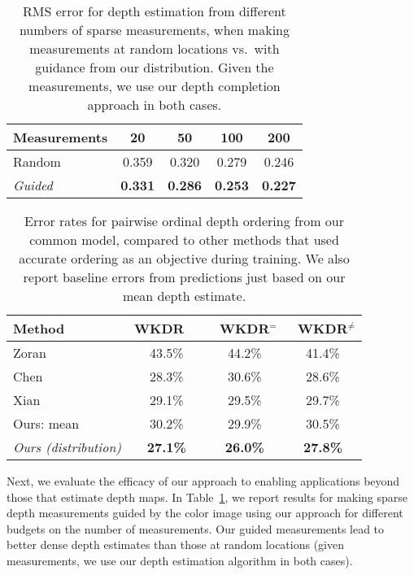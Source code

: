 \documentclass[10pt,twocolumn,letterpaper]{article}
\begin{document}
\begin{table}[!t]
  \begin{center}\small
  \setlength\tabcolsep{10pt}
  \begin{tabular}{lcccc}
    \toprule
    Measurements & 20 & 50 & 100 & 200 \\ \midrule
    Random & 0.359 & 0.320 & 0.279 & 0.246 \\
    \em Guided & \bf 0.331 & \bf 0.286 & \bf 0.253 & \bf 0.227 \\\bottomrule
             
  \end{tabular}
  \end{center}
  \caption{RMS error for depth estimation from different numbers of sparse measurements, when making measurements at random locations vs.\ with guidance from our distribution. Given the measurements, we use our depth completion approach in both cases.}
  \label{tab:opt}
\end{table}
\begin{table}[!t]
  \begin{center}\small
  \setlength\tabcolsep{4pt}
  \begin{tabular}{lccc}
    \toprule
    Method & WKDR~~ & ~WKDR$^{=}$ & ~WKDR$^{\neq}$ \\ \toprule
    Zoran \cite{zoran2015learning} & 43.5\% & 44.2\% & 41.4\% \\
    Chen \cite{chen2016single} & 28.3\% & 30.6\% & 28.6\% \\
    Xian \cite{xian2018monocular} & 29.1\% & 29.5\% & 29.7\% \\
    Ours: mean  & 30.2\% & 29.9\% & 30.5\% \\
    \em Ours (distribution) & \bf 27.1\% & \bf 26.0\% & \bf 27.8\% \\ \bottomrule
  \end{tabular}
  \end{center}
  \caption{Error rates for pairwise ordinal depth ordering from our common model, compared to other methods that used accurate ordering as an objective during training. We also report baseline errors from predictions just based on our mean depth estimate.}
  \label{tab:pa}
\end{table}

Next, we evaluate the efficacy of our approach to enabling applications beyond those that estimate depth maps. In Table~\ref{tab:opt}, we report results for making sparse depth measurements guided by the color image using our approach for different budgets on the number of measurements. Our guided measurements lead to better dense depth estimates than those at random locations (given measurements, we use our depth estimation algorithm in both cases).
\end{document}
